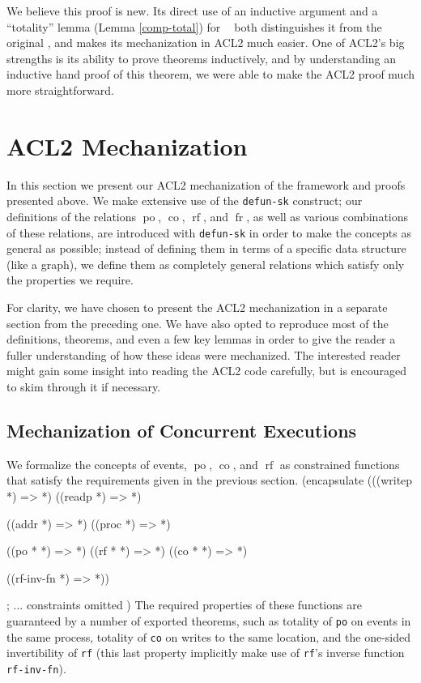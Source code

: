 \documentclass[]{eptcs}
\newenvironment{qv}
{\quote\Verbatim}
{\endVerbatim\endquote}
\DeclareMathOperator{\po}{po}
\DeclareMathOperator{\co}{co}
\DeclareMathOperator{\rf}{rf}
\DeclareMathOperator{\fr}{fr}
\DeclareMathOperator{\comp}{com^+}
\begin{document}
We believe this proof is new. Its direct use of an inductive argument and a ``totality'' lemma (Lemma \ref{comp-total}) for $\comp$ both distinguishes it from the original \cite{alglave_thesis}, and makes its mechanization in ACL2 much easier. One of ACL2's big strengths is its ability to prove theorems inductively, and by understanding an inductive hand proof of this theorem, we were able to make the ACL2 proof much more straightforward.

\section{ACL2 Mechanization}

In this section we present our ACL2 mechanization of the framework and proofs presented above. We make extensive use of the \verb|defun-sk| construct; our definitions of the relations $\po$, $\co$, $\rf$, and $\fr$, as well as various combinations of these relations, are introduced with \verb|defun-sk| in order to make the concepts as general as possible; instead of defining them in terms of a specific data structure (like a graph), we define them as completely general relations which satisfy only the properties we require.

For clarity, we have chosen to present the ACL2 mechanization in a separate section from the preceding one. We have also opted to reproduce most of the definitions, theorems, and even a few key lemmas in order to give the reader a fuller understanding of how these ideas were mechanized. The interested reader might gain some insight into reading the ACL2 code carefully, but is encouraged to skim through it if necessary.

\subsection{Mechanization of Concurrent Executions}

We formalize the concepts of events, $\po$, $\co$, and $\rf$ as constrained functions that satisfy the requirements given in the previous section.
\begin{qv}
(encapsulate
 (((writep *) => *)
  ((readp *) => *)

  ((addr *) => *)
  ((proc *) => *)

  ((po * *) => *)
  ((rf * *) => *)
  ((co * *) => *)
  
  ((rf-inv-fn *) => *))
  
  ; ... constraints omitted
)
\end{qv}
The required properties of these functions are guaranteed by a number of exported theorems, such as totality of \verb|po| on events in the same process, totality of \verb|co| on writes to the same location, and the one-sided invertibility of \verb|rf| (this last property implicitly make use of \verb|rf|'s inverse function \verb|rf-inv-fn|).
\end{document}
